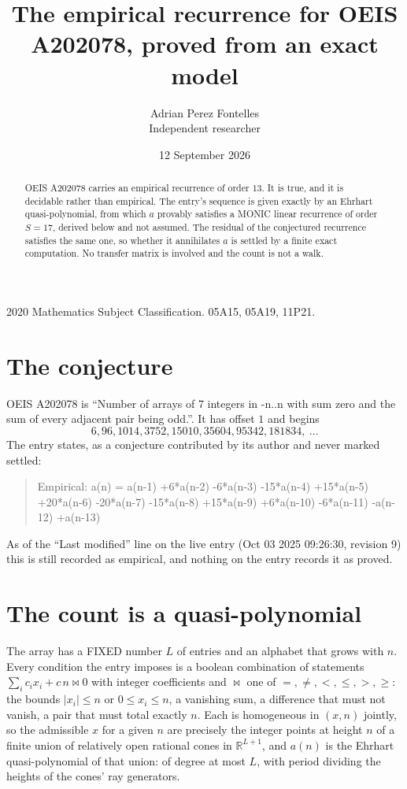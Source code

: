 \documentclass[11pt,a4paper]{article}
\title{The empirical recurrence for OEIS A202078, proved from an exact model}
\author{Adrian Perez Fontelles\\ \small Independent researcher}
\date{12 September 2026}
\theoremstyle{plain}
\theoremstyle{definition}
\begin{document}
\maketitle

\begin{abstract}
OEIS A202078 carries an empirical recurrence of order $13$. It is true, and it is
decidable rather than empirical. The entry's sequence is given exactly by an Ehrhart quasi-polynomial, from
which $a$ provably satisfies a MONIC linear recurrence of order $S=17$, derived below and not
assumed. The residual of the conjectured recurrence satisfies the same one, so whether it
annihilates $a$ is settled by a finite exact computation. No transfer matrix is involved and
the count is not a walk.
\end{abstract}

\noindent\small 2020 Mathematics Subject Classification. 05A15, 05A19, 11P21.\normalsize

\section{The conjecture}

OEIS A202078 is ``Number of arrays of 7 integers in -n..n with sum zero and the sum of every adjacent pair being odd.''. It has offset $1$ and begins
\[
6, 96, 1014, 3752, 15010, 35604, 95342, 181834,\ \dots
\]
The entry states, as a conjecture contributed by its author and never marked settled:
\begin{quote}
Empirical: a(n) = a(n-1) +6*a(n-2) -6*a(n-3) -15*a(n-4) +15*a(n-5) +20*a(n-6) -20*a(n-7) -15*a(n-8) +15*a(n-9) +6*a(n-10) -6*a(n-11) -a(n-12) +a(n-13)
\end{quote}
As of the ``Last modified'' line on the live entry (Oct 03 2025 09:26:30, revision 9)
this is still recorded as empirical, and nothing on the entry records it as proved.

\section{The count is a quasi-polynomial}

The array has a FIXED number $L$ of entries and an alphabet that grows with $n$. Every
condition the entry imposes is a boolean combination of statements
$\sum_i c_ix_i + c\,n \bowtie 0$ with integer coefficients and $\bowtie$ one of
$=,\ne,<,\le,>,\ge$: the bounds $|x_i|\le n$ or $0\le x_i\le n$, a vanishing sum, a difference
that must not vanish, a pair that must total exactly $n$. Each is homogeneous in $(x,n)$
jointly, so the admissible $x$ for a given $n$ are precisely the integer points at height $n$
of a finite union of relatively open rational cones in $\mathbb{R}^{L+1}$, and $a(n)$ is
the Ehrhart quasi-polynomial of that union: of degree at most $L$, with period dividing the
heights of the cones' ray generators.
\end{document}
